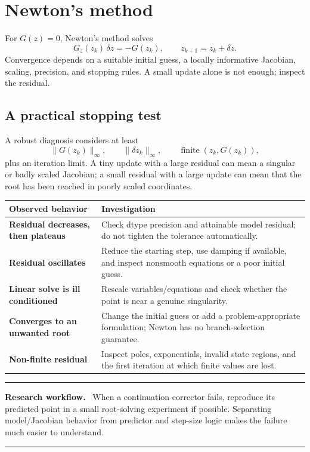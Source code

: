 \documentclass[11pt,oneside]{book}
\newenvironment{workflowbox}
  {\par\medskip\noindent\begin{minipage}{\textwidth}
   \color{JaxGreen!70!black}\rule{\textwidth}{0.8pt}\par
   \textbf{Research workflow.}\ \color{black}}
  {\par\color{JaxGreen!70!black}\rule{\textwidth}{0.8pt}
   \end{minipage}\par\medskip}
\begin{document}
\appendix

\chapter{Newton's method}

For $G(z)=0$, Newton's method solves
\[
  G_z(z_k)\,\delta z=-G(z_k),
  \qquad z_{k+1}=z_k+\delta z.
\]
Convergence depends on a suitable initial guess, a locally informative
Jacobian, scaling, precision, and stopping rules. A small update alone is not
enough; inspect the residual.

\section{A practical stopping test}

A robust diagnosis considers at least
\[
  \|G(z_k)\|_\infty,\qquad
  \|\delta z_k\|_\infty,\qquad
  \operatorname{finite}(z_k,G(z_k)),
\]
plus an iteration limit. A tiny update with a large residual can mean a
singular or badly scaled Jacobian; a small residual with a large update can
mean that the root has been reached in poorly scaled coordinates.

\noindent\begin{tabularx}{\textwidth}{>{\bfseries}p{}X}
\toprule
Observed behavior & Investigation\\
\midrule
Residual decreases, then plateaus & Check dtype precision and attainable
model residual; do not tighten the tolerance automatically.\\
Residual oscillates & Reduce the starting step, use damping if available, and
inspect nonsmooth equations or a poor initial guess.\\
Linear solve is ill conditioned & Rescale variables/equations and check
whether the point is near a genuine singularity.\\
Converges to an unwanted root & Change the initial guess or add a
problem-appropriate formulation; Newton has no branch-selection guarantee.\\
Non-finite residual & Inspect poles, exponentials, invalid state regions, and
the first iteration at which finite values are lost.\\
\bottomrule
\end{tabularx}

\begin{workflowbox}
When a continuation corrector fails, reproduce its predicted point in a small
root-solving experiment if possible. Separating model/Jacobian behavior from
predictor and step-size logic makes the failure much easier to understand.
\end{workflowbox}
\end{document}

